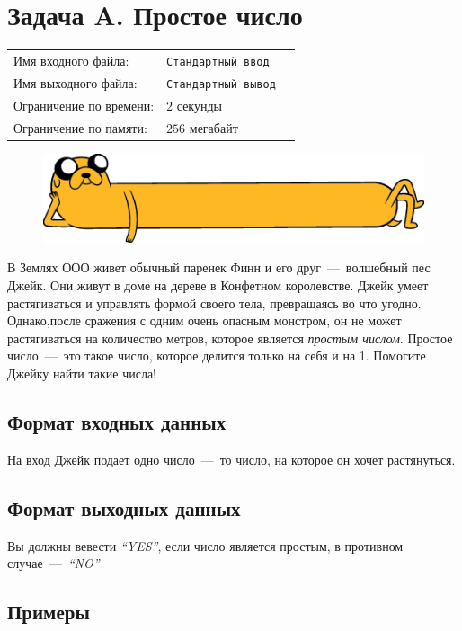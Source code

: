 \documentclass[12pt]{scrartcl}
\newcommand{\inputFile}{Стандартный ввод}
\newcommand{\outputFile}{Стандартный вывод}
\begin{document}
\singlespacing

\section*{Задача A. Простое число}

\begin{tabularx}{\textwidth}{l l X}
    Имя входного файла: & \texttt{\inputFile} \\
    Имя выходного файла: & \texttt{\outputFile} \\
    Ограничение по времени: & $2$ секунды \\
    Ограничение по памяти: & $256$ мегабайт \\
\end{tabularx}

\begin{figure}[h]
    \includegraphics[scale=0.5]{jake}
\end{figure}

В Землях ООО живет обычный паренек Финн и его друг~---~волшебный пес Джейк. 
Они живут в доме на дереве в Конфетном королевстве. Джейк умеет растягиваться и управлять формой своего тела, превращаясь во что угодно. Однако,после сражения с одним очень опасным монстром, он не может растягиваться на количество метров, которое является \emph{простым числом}. Простое число~---~это такое число, которое делится только на себя и на 1. Помогите Джейку найти такие числа!

\subsection*{Формат входных данных}
На вход Джейк подает одно число~---~то число, на которое он хочет растянуться.


\subsection*{Формат выходных данных}
Вы должны вевести \emph{``YES''}, если число является простым, в противном случае~---~\emph{``NO''}


\subsection*{Примеры}
\end{document}
